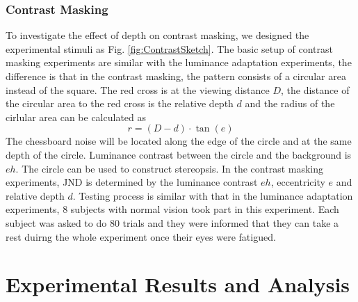 \documentclass[journal]{IEEEtran}
\begin{document}
\subsubsection{Contrast Masking}
To investigate the effect of depth on contrast masking, we designed the experimental stimuli as Fig. \ref{fig:ContrastSketch}. The basic setup of contrast masking experiments are similar with the luminance adaptation experiments, the difference is that in the contrast masking, the pattern consists of a circular area instead of the square. The red cross is at the viewing distance $D$, the distance of the circular area to the red cross is the relative depth $d$ and the radius of the cirlular area can be calculated as
\begin{equation}
r=\left ( D-d \right )\cdot \tan \left ( e \right )
\end{equation}
The chessboard noise will be located along the edge of the circle and at the same depth of the circle. Luminance contrast between the circle and the background is $eh$. The circle can be used to construct stereopsis. In the contrast masking experiments, JND is determined by the luminance contrast $eh$, eccentricity $e$ and relative depth $d$. Testing process is similar with that in the luminance adaptation experiments, 8 subjects with normal vision took part in this experiment. Each subject was asked to do 80 trials and they were informed that they can take a rest duirng the whole experiment once their eyes were fatigued.


\section{Experimental Results and Analysis}
\end{document}

